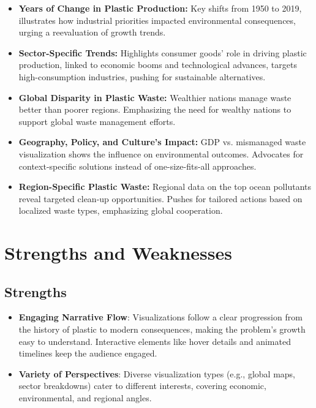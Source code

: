 \documentclass{article}
\begin{document}
\begin{itemize}
    \item \textbf{Years of Change in Plastic Production:} Key shifts from 1950 to 2019, illustrates how industrial priorities impacted environmental consequences, urging a reevaluation of growth trends.

    \item \textbf{Sector-Specific Trends:} Highlights consumer goods' role in driving plastic production, linked to economic booms and technological advances, targets high-consumption industries, pushing for sustainable alternatives.

    \item \textbf{Global Disparity in Plastic Waste:} Wealthier nations manage waste better than poorer regions. Emphasizing the need for wealthy nations to support global waste management efforts.

    \item \textbf{Geography, Policy, and Culture's Impact:} GDP vs. mismanaged waste visualization shows the influence on environmental outcomes. Advocates for context-specific solutions instead of one-size-fits-all approaches.

    \item \textbf{Region-Specific Plastic Waste:} Regional data on the top ocean pollutants reveal targeted clean-up opportunities. Pushes for tailored actions based on localized waste types, emphasizing global cooperation.
\end{itemize}

\section{Strengths and Weaknesses}

\subsection*{Strengths}
\begin{itemize}
    \item \textbf{Engaging Narrative Flow}: Visualizations follow a clear progression from the history of plastic to modern consequences, making the problem's growth easy to understand. Interactive elements like hover details and animated timelines keep the audience engaged.
    \item \textbf{Variety of Perspectives}: Diverse visualization types (e.g., global maps, sector breakdowns) cater to different interests, covering economic, environmental, and regional angles.
\end{itemize}
\end{document}
